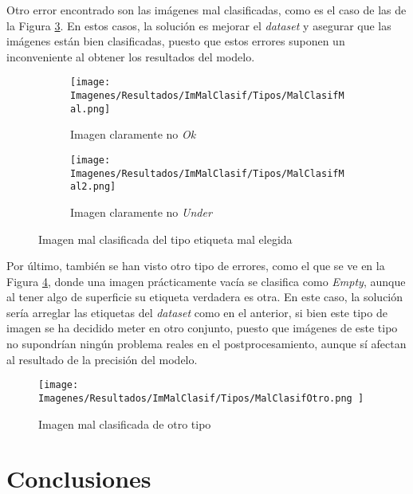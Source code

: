 \documentclass{report}
\begin{document}
Otro error encontrado son las imágenes mal clasificadas, como es el caso de las de la Figura \ref{fig:MalClasificadaMal}. En estos casos, la solución es mejorar el \textit{dataset} y asegurar que las imágenes están bien clasificadas, puesto que estos errores suponen un inconveniente al obtener los resultados del modelo.


\begin{figure}[H]
\centering
            \begin{subfigure}[b]{0.45\linewidth}
	 	\centering
	 		\texttt{[image: Imagenes/Resultados/ImMalClasif/Tipos/MalClasifMal.png]}
	 		\caption{ Imagen claramente no \textit{Ok} }
                    \label{fig:MalClasificadaMal1}
	 	\end{subfigure}
	 	\begin{subfigure}[b]{0.45\linewidth}
	 	\centering
	 		\texttt{[image: Imagenes/Resultados/ImMalClasif/Tipos/MalClasifMal2.png]}
	 		\caption{ Imagen claramente no \textit{Under} }
                    \label{fig:MalClasificadaMal2}
	 	\end{subfigure}
    \caption{ Imagen mal clasificada del tipo etiqueta mal elegida  }
    \label{fig:MalClasificadaMal}
\end{figure}


Por último, también se han visto otro tipo de errores, como el que se ve en la Figura \ref{fig:MalClasificadaOtro}, donde una imagen prácticamente vacía se clasifica como \textit{Empty}, aunque al tener algo de superficie su etiqueta verdadera es otra. En este caso, la solución sería arreglar las etiquetas del \textit{dataset} como en el anterior, si bien este tipo de imagen se ha decidido meter en otro conjunto, puesto que imágenes de este tipo no supondrían ningún problema reales en el postprocesamiento, aunque sí afectan al resultado de la precisión del modelo.


\begin{figure}[H]
    \centering
    \texttt{[image: Imagenes/Resultados/ImMalClasif/Tipos/MalClasifOtro.png ]}
    \caption{ Imagen mal clasificada de otro tipo  }
    \label{fig:MalClasificadaOtro}
\end{figure}







 
\chapter{Conclusiones}
\end{document}
